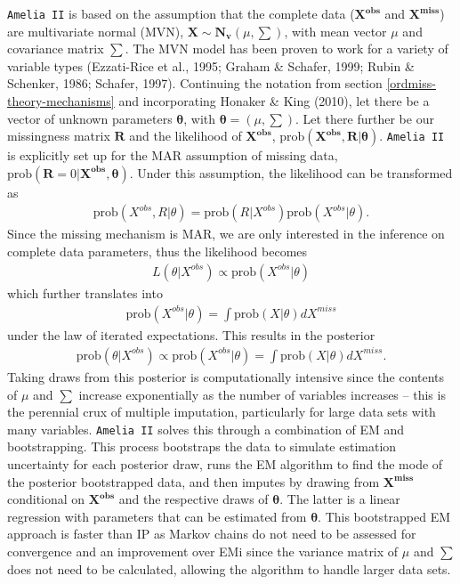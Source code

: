 \documentclass[12pt,econ]{sources/authesis}
\begin{document}
\texttt{Amelia\ II} is based on the assumption that the complete data (\(\bm{X^{obs}}\) and \(\bm{X^{miss}}\)) are multivariate normal (MVN), \(\bm{X} \sim \bm{N_v}(\mu, \sum)\), with mean vector \(\mu\) and covariance matrix \(\sum\). The MVN model has been proven to work for a variety of variable types (Ezzati-Rice et al., 1995; Graham \& Schafer, 1999; Rubin \& Schenker, 1986; Schafer, 1997). Continuing the notation from section \ref{ordmiss-theory-mechanisms} and incorporating Honaker \& King (2010), let there be a vector of unknown parameters \(\bm{\theta}\), with \(\bm{\theta} = (\mu, \sum)\). Let there further be our missingness matrix \(\bm{R}\) and the likelihood of \(\bm{X^{obs}}\), \(\text{prob}(\bm{X^{obs}}, \bm{R} | \bm{\theta})\). \texttt{Amelia\ II} is explicitly set up for the MAR assumption of missing data, \(\text{prob}(\bm{R} = 0 | \bm{X^{obs}}, \bm{\theta})\). Under this assumption, the likelihood can be transformed as
\begin{align}
\text{prob}(X^{obs}, R | \theta) = \text{prob}(R | X^{obs}) \text{prob}(X^{obs} | \theta).
\end{align}
Since the missing mechanism is MAR, we are only interested in the inference on complete data parameters, thus the likelihood becomes
\begin{align}
L(\theta | X^{obs}) \propto \text{prob}(X^{obs} | \theta)
\end{align}
which further translates into
\begin{align}
\text{prob}(X^{obs} | \theta) = \int \text{prob}(X | \theta) dX^{miss}
\end{align}
under the law of iterated expectations. This results in the posterior
\begin{align}
\text{prob}(\theta | X^{obs}) \propto \text{prob}(X^{obs} | \theta) = \int \text{prob}(X | \theta) dX^{miss}.
\end{align}
Taking draws from this posterior is computationally intensive since the contents of \(\mu\) and \(\sum\) increase exponentially as the number of variables increases -- this is the perennial crux of multiple imputation, particularly for large data sets with many variables. \texttt{Amelia\ II} solves this through a combination of EM and bootstrapping. This process bootstraps the data to simulate estimation uncertainty for each posterior draw, runs the EM algorithm to find the mode of the posterior bootstrapped data, and then imputes by drawing from \(\bm{X^{miss}}\) conditional on \(\bm{X^{obs}}\) and the respective draws of \(\bm{\theta}\). The latter is a linear regression with parameters that can be estimated from \(\bm{\theta}\). This bootstrapped EM approach is faster than IP as Markov chains do not need to be assessed for convergence and an improvement over EMi since the variance matrix of \(\mu\) and \(\sum\) does not need to be calculated, allowing the algorithm to handle larger data sets.
\end{document}
